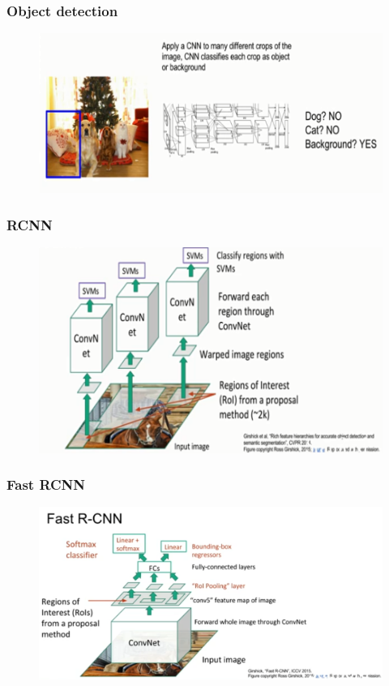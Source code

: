 \documentclass{beamer}
\begin{document}
\begin{frame}
	\frametitle{Object detection}
	
	\begin{figure}
		\includegraphics[width=\linewidth]{Pics/objectdetect2.PNG}
		
	\end{figure}
	
\end{frame}
\begin{frame}
	\frametitle{RCNN}
	
	\begin{figure}
		\includegraphics[width=\linewidth]{Pics/rcnn.PNG}
		
	\end{figure}
	
\end{frame}
\begin{frame}
	\frametitle{Fast RCNN}
	
	\begin{figure}
		\includegraphics[width=\linewidth]{Pics/fastrcnn.PNG}
		
	\end{figure}
	
\end{frame}
\end{document}

